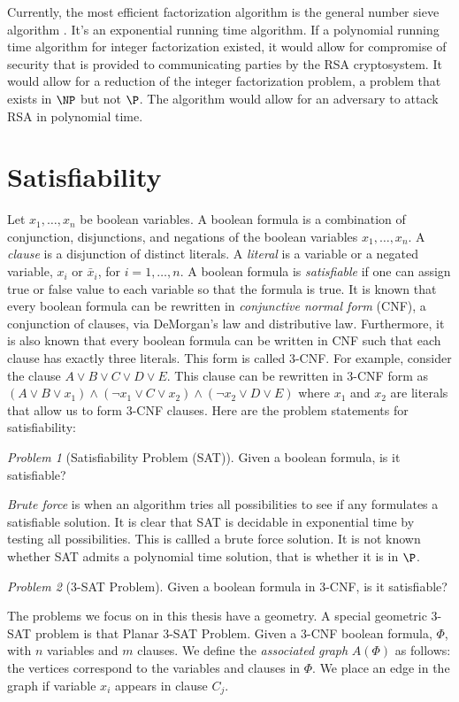\documentclass[10pt]{CSUNthesis}
\theoremstyle{plain}%
\theoremstyle{definition}
\theoremstyle{remark}
\newtheorem{prob}{Problem}
\begin{document}
Currently, the most efficient factorization algorithm is the general number sieve algorithm \cite{lenstra1993number}.
It's an exponential running time algorithm.
If a polynomial running time algorithm for integer factorization existed, it would allow for compromise of security that is provided to communicating parties by the RSA cryptosystem.
It would allow for a reduction of the integer factorization problem, a problem that exists in $\NP$ but not $\P$.
The algorithm would allow for an adversary to attack RSA \cite{menezes1996handbook} in polynomial time.



\section{Satisfiability}
Let $x_1, \dots, x_n$ be boolean variables.  A boolean formula is a combination of conjunction, 
disjunctions, and negations of the boolean variables $x_1,  \dots, x_n$.   
A \textit{clause} is a disjunction of distinct literals.  
A \textit{literal} is a variable or a negated variable, $x_i$ or $\bar{x}_i$, for $i = 1,\dots,n$. 
A boolean formula is \textit{satisfiable} if one can assign true or false value to each variable so that the formula is true. 
It is known that every boolean formula can be rewritten in \textit{conjunctive normal form} (CNF), a conjunction of clauses, via DeMorgan's law and distributive law.   
Furthermore, it is also known that every boolean formula can be written in CNF such that each clause has exactly three literals. 
This form is called 3-CNF.  
For example, consider the clause $A \lor B \lor C \lor D \lor E$. 
This clause can be rewritten in 3-CNF form as $(A \lor B \lor x_1) \land (\lnot x_1 \lor C \lor x_2) \land (\lnot x_2 \lor D \lor E)$ where $x_1$ and $x_2$ are literals that allow us to form 3-CNF clauses.
Here are the problem statements for satisfiability:
\begin{prob}[Satisfiability Problem (SAT)]\label{prob:Satisfiability-1}%
Given a boolean formula, is it satisfiable? \cite{skiena2009algorithm}
\end{prob} 
\textit{Brute force} is when an algorithm tries all possibilities to see if any formulates a satisfiable solution.
It is clear that SAT is decidable in exponential time by testing all possibilities.
This is callled a brute force solution.
It is not known whether SAT admits a polynomial time solution, that is whether it is in $\P$. 
\begin{prob}[3-SAT Problem]
Given a boolean formula in 3-CNF, is it satisfiable?
\end{prob}
The problems we focus on in this thesis have a geometry.  
A special geometric 3-SAT problem is that Planar 3-SAT Problem.   
Given a 3-CNF boolean formula, $\Phi$, with $n$ variables and $m$ clauses.
  We define the \textit{associated graph} $A(\Phi)$ as follows: the vertices correspond to the variables and clauses in $\Phi$.  
  We place an edge in the graph if variable $x_i$ appears in clause $C_j$.
\end{document}
